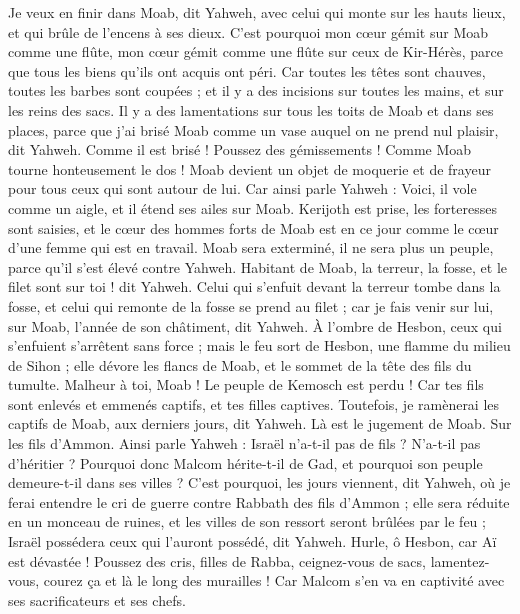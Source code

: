 \begin{multicols}{2}
Je veux en finir dans Moab, dit Yahweh, avec celui qui monte sur les hauts lieux, et qui brûle de l'encens à ses dieux.
C'est pourquoi mon cœur gémit sur Moab comme une flûte, mon cœur gémit comme une flûte sur ceux de Kir-Hérès, parce que tous les biens qu'ils ont acquis ont péri.
Car toutes les têtes sont chauves, toutes les barbes sont coupées ; et il y a des incisions sur toutes les mains, et sur les reins des sacs.
Il y a des lamentations sur tous les toits de Moab et dans ses places, parce que j'ai brisé Moab comme un vase auquel on ne prend nul plaisir, dit Yahweh.
Comme il est brisé ! Poussez des gémissements ! Comme Moab tourne honteusement le dos ! Moab devient un objet de moquerie et de frayeur pour tous ceux qui sont autour de lui.
Car ainsi parle Yahweh : Voici, il vole comme un aigle, et il étend ses ailes sur Moab.
Kerijoth est prise, les forteresses sont saisies, et le cœur des hommes forts de Moab est en ce jour comme le cœur d'une femme qui est en travail.
Moab sera exterminé, il ne sera plus un peuple, parce qu'il s'est élevé contre Yahweh.
Habitant de Moab, la terreur, la fosse, et le filet sont sur toi ! dit Yahweh.
Celui qui s'enfuit devant la terreur tombe dans la fosse, et celui qui remonte de la fosse se prend au filet ; car je fais venir sur lui, sur Moab, l'année de son châtiment, dit Yahweh.
À l'ombre de Hesbon, ceux qui s'enfuient s'arrêtent sans force ; mais le feu sort de Hesbon, une flamme du milieu de Sihon ; elle dévore les flancs de Moab, et le sommet de la tête des fils du tumulte.
Malheur à toi, Moab ! Le peuple de Kemosch est perdu ! Car tes fils sont enlevés et emmenés captifs, et tes filles captives.
Toutefois, je ramènerai les captifs de Moab, aux derniers jours, dit Yahweh. Là est le jugement de Moab.
\VerseOne{}Sur les fils d'Ammon. Ainsi parle Yahweh : Israël n'a-t-il pas de fils ? N'a-t-il pas d'héritier ? Pourquoi donc Malcom hérite-t-il de Gad, et pourquoi son peuple demeure-t-il dans ses villes ?
C'est pourquoi, les jours viennent, dit Yahweh, où je ferai entendre le cri de guerre contre Rabbath des fils d'Ammon ; elle sera réduite en un monceau de ruines, et les villes de son ressort seront brûlées par le feu ; Israël possédera ceux qui l'auront possédé, dit Yahweh.
Hurle, ô Hesbon, car Aï est dévastée ! Poussez des cris, filles de Rabba, ceignez-vous de sacs, lamentez-vous, courez ça et là le long des murailles ! Car Malcom s'en va en captivité avec ses sacrificateurs et ses chefs.

\end{multicols}
